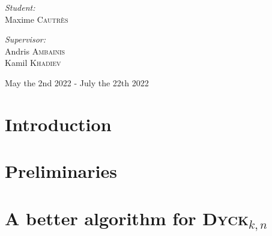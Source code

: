 \documentclass[11pt,a4paper]{article}
\newcommand{\Dyck}[1]{\textsc{Dyck$_{#1}$}}
\theoremstyle{definition}
\theoremstyle{plain}
\theoremstyle{definition}
\begin{document}
\begin{titlepage}
\begin{sffamily}
\begin{center}
            \hspace{-0.8cm}
            \begin{minipage}{0.4\textwidth}
                \begin{flushleft} \large
                    \emph{Student:} \\
                    Maxime \textsc{Cautrès}\\
                \end{flushleft}
            \end{minipage}
            \hspace{3cm}
            \begin{minipage}{0.4\textwidth}
                \begin{flushright} \large
                    \emph{Supervisor:}\\
                    Andris \textsc{Ambainis}\\
                    Kamil \textsc{Khadiev}\\
                \end{flushright}
            \end{minipage}

            \vspace*{0.5cm}
            {\large   May the 2nd 2022 -  July the 22th 2022}
        \end{center}
    \end{sffamily}
\end{titlepage}

\tableofcontents

\newpage

\section{Introduction}



\section{Preliminaries}\label{sec:preli}



\section{A better algorithm for \Dyck{k,n}}
\label{main_section}


\end{document}

